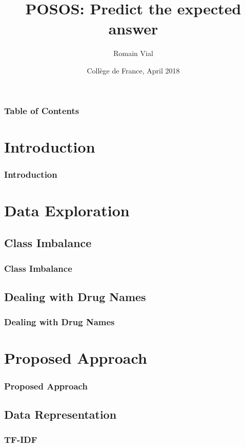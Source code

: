 \documentclass{beamer}
\title{POSOS: Predict the expected answer}
\author{Romain Vial}
\institute{romain.vial@mines-paristech.fr}
\date{Collège de France, April 2018}
\begin{document}
 
\frame{\titlepage}

\begin{frame}
\frametitle{Table of Contents}
\tableofcontents[subsubsectionstyle=hide, subsectionstyle=hide]
\end{frame}

\section{Introduction}

\begin{frame}
\frametitle{Introduction}

\end{frame}

\section{Data Exploration}

\subsection{Class Imbalance}

\begin{frame}
\frametitle{Class Imbalance}

\end{frame}

\subsection{Dealing with Drug Names}

\begin{frame}
\frametitle{Dealing with Drug Names}

\end{frame}

\section{Proposed Approach}

\begin{frame}
\frametitle{Proposed Approach}

\end{frame}

\subsection{Data Representation}

\begin{frame}
\frametitle{TF-IDF}

\end{frame}
\end{document}
